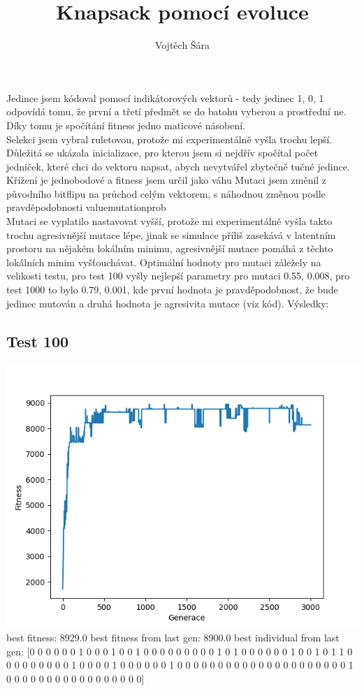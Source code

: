 \documentclass{article}
\title{Knapsack pomocí evoluce}
\author{Vojtěch Šára}
\begin{document}
\maketitle
Jedince jsem kódoval pomocí indikátorových vektorů - tedy jedinec 1, 0, 1 odpovídá tomu, že první a třetí předmět se do batohu
vyberou a prostřední ne. Díky tomu je spočítání fitness jedno maticové násobení.\\
Selekci jsem vybral ruletovou, protože mi experimentálně vyšla trochu lepší.\\
Důležitá se ukázala inicializace, pro kterou jsem si nejdřív spočítal počet jedniček, které chci do vektoru napsat, abych nevytvářel
zbytečně tučné jedince.
Křížení je jednobodové a fitness jsem určil jako váhu 
Mutaci jsem změnil z původního bitflipu na průchod celým vektorem, s náhodnou změnou podle pravděpodobnosti valuemutationprob\\
Mutaci se vyplatilo nastavovat vyšší, protože mi experimentálně vyšla
takto trochu agresivnější mutace lépe, jinak se simulace příliš zasekává v latentním prostoru
na nějakém lokálním minimu, agresivnější mutace pomáhá z těchto lokálních minim vyšťouchávat.
Optimální hodnoty pro mutaci záležely na velikosti testu, pro test 100 vyšly nejlepší parametry pro mutaci 0.55, 0.008, pro test 1000
to bylo 0.79, 0.001, kde první hodnota je pravděpodobnost, že bude jedinec mutován a druhá hodnota je agresivita mutace (viz kód).
Výsledky:
\subsection*{Test 100}
\includegraphics{Figure_2.png}
best fitness:  8929.0
best fitness from last gen:  8900.0
best individual from last gen:  [0 0 0 0 0 0 1 0 0 0 1 0 0 1 0 0 0 0 0 0 0 0 0 1 0 1 0 0 0 0 0 0 1 0 0 1 0
 1 1 0 0 0 0 0 0 0 0 0 1 0 0 0 0 1 0 0 0 0 0 0 1 0 0 0 0 0 0 0 0 0 0 0 0 0
 0 0 0 0 0 0 0 0 1 0 0 0 0 0 0 0 0 0 0 0 0 0 0 0 0 0]
\end{document}
